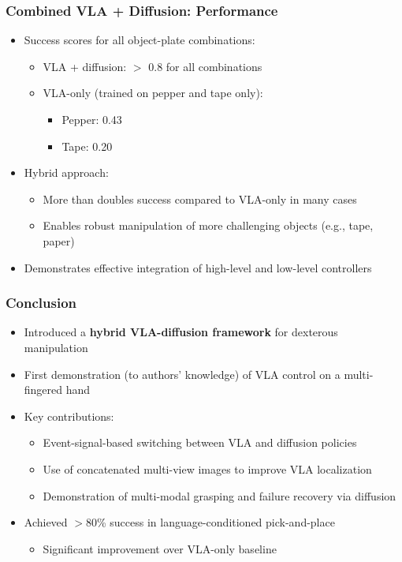 \documentclass{beamer}
\begin{document}
\begin{frame}
  \frametitle{Combined VLA + Diffusion: Performance}
  \small
  \begin{itemize}
    \item Success scores for all object-plate combinations:
      \begin{itemize}
        \item VLA + diffusion: $>$ 0.8 for all combinations
        \item VLA-only (trained on pepper and tape only):
          \begin{itemize}
            \item Pepper: 0.43
            \item Tape: 0.20
          \end{itemize}
      \end{itemize}
    \item Hybrid approach:
      \begin{itemize}
        \item More than doubles success compared to VLA-only in many cases
        \item Enables robust manipulation of more challenging objects (e.g., tape, paper)
      \end{itemize}
    \item Demonstrates effective integration of high-level and low-level controllers
  \end{itemize}
\end{frame}

\begin{frame}
  \frametitle{Conclusion}
  \small
  \begin{itemize}
    \item Introduced a \textbf{hybrid VLA-diffusion framework} for dexterous manipulation
    \item First demonstration (to authors' knowledge) of VLA control on a multi-fingered hand
    \item Key contributions:
      \begin{itemize}
        \item Event-signal-based switching between VLA and diffusion policies
        \item Use of concatenated multi-view images to improve VLA localization
        \item Demonstration of multi-modal grasping and failure recovery via diffusion
      \end{itemize}
    \item Achieved $>$80\% success in language-conditioned pick-and-place
      \begin{itemize}
        \item Significant improvement over VLA-only baseline
      \end{itemize}
  \end{itemize}
\end{frame}
\end{document}
